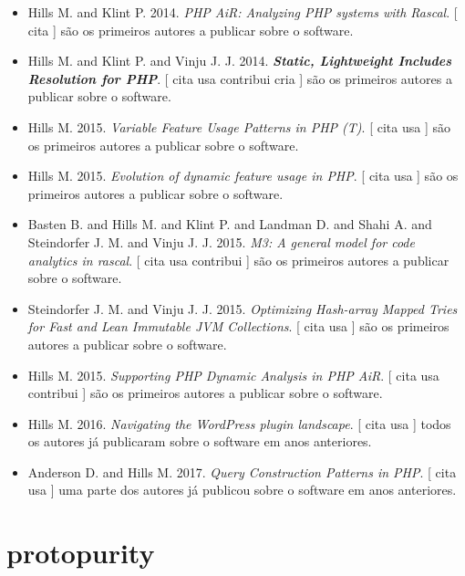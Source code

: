 \begin{itemize}
\item Hills M. and Klint P.
      2014.
        \textit{ PHP AiR: Analyzing PHP systems with Rascal}.
      [
          cita
      ]
são os primeiros autores a publicar sobre o software.
\item Hills M. and Klint P. and Vinju J. J.
      2014.
        \textbf{\textit{ Static, Lightweight Includes Resolution for PHP}}.
      [
          cita
          usa
          contribui
          cria
      ]
são os primeiros autores a publicar sobre o software.
\item Hills M.
      2015.
        \textit{ Variable Feature Usage Patterns in PHP (T)}.
      [
          cita
          usa
      ]
são os primeiros autores a publicar sobre o software.
\item Hills M.
      2015.
        \textit{ Evolution of dynamic feature usage in PHP}.
      [
          cita
          usa
      ]
são os primeiros autores a publicar sobre o software.
\item Basten B. and Hills M. and Klint P. and Landman D. and Shahi A. and Steindorfer J. M. and Vinju J. J.
      2015.
        \textit{ M3: A general model for code analytics in rascal}.
      [
          cita
          usa
          contribui
      ]
são os primeiros autores a publicar sobre o software.
\item Steindorfer J. M. and Vinju J. J.
      2015.
        \textit{ Optimizing Hash-array Mapped Tries for Fast and Lean Immutable JVM Collections}.
      [
          cita
          usa
      ]
são os primeiros autores a publicar sobre o software.
\item Hills M.
      2015.
        \textit{ Supporting PHP Dynamic Analysis in PHP AiR}.
      [
          cita
          usa
          contribui
      ]
são os primeiros autores a publicar sobre o software.
\item Hills M.
      2016.
        \textit{ Navigating the WordPress plugin landscape}.
      [
          cita
          usa
      ]
todos os autores já publicaram sobre o software em anos anteriores.
\item Anderson D. and Hills M.
      2017.
        \textit{ Query Construction Patterns in PHP}.
      [
          cita
          usa
      ]
uma parte dos autores já publicou sobre o software em anos anteriores.
\end{itemize}
\section{protopurity}

